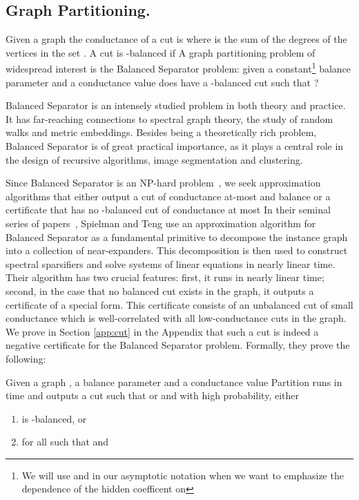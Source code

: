 \documentclass[twoside,leqno,twocolumn]{article}
\newcommand{\BS}{{\sc Balanced Separator}\xspace}
\numberwithin{equation}{section}
\begin{document}
\subsection{Graph Partitioning.}
Given a graph   the conductance of
a cut  is   where  is the sum of the degrees of the vertices in the set . 
A cut  is -balanced if  
A graph partitioning problem of widespread interest is the  \BS  problem: given  a constant\footnote{
We will use  and  in our asymptotic notation when we want to emphasize the dependence of the hidden coefficent on }
balance parameter  and a conductance value  does  have a -balanced cut  such that ?

\BS is an intensely studied problem in both theory and practice.  
It has far-reaching connections to spectral graph theory, the study of random walks and metric embeddings. Besides being a theoretically rich problem, \BS is of great practical importance, as it plays a central role in the design of recursive algorithms, image segmentation and clustering. 


Since {\BS}  is an  NP-hard problem~\cite{GareyJ79}, we seek approximation algorithms that either output a cut of conductance at-most  and balance  or a certificate that  has no -balanced cut of conductance at most  
In their seminal series of papers~\cite{ST1, ST2, ST3}, Spielman and Teng use an approximation algorithm for {\BS} as a fundamental primitive to decompose the instance graph into a collection of near-expanders. This decomposition is then used to construct spectral sparsifiers and solve systems of linear equations in nearly linear time. Their algorithm has two crucial features: first, it runs in nearly linear time; second, in the case that no balanced cut exists in the graph, it outputs a certificate of a special form. This certificate consists of an unbalanced cut of small conductance which is well-correlated with all low-conductance cuts in the graph. We prove in Section \ref{app:cut} in the Appendix that such a cut is indeed a negative certificate for the \BS problem.
Formally, they prove the following:
\begin{theorem}\cite{ST1} \label{thm:st}
Given a graph  , a balance parameter  and a conductance value  {\sc Partition} runs in time  and outputs a cut  such that    or   and with high probability, either
\begin{enumerate}

	\item  is -balanced, or 
	\item for all  such that  and   

\end{enumerate}
\end{theorem}
\end{document}
